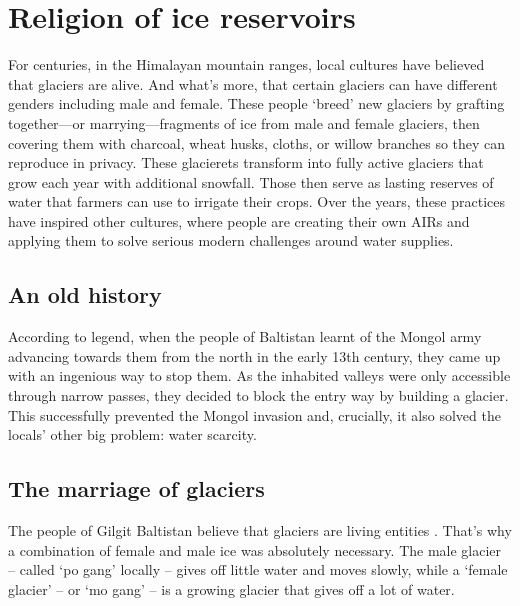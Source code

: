 \chapter{Religion of ice reservoirs}


For centuries, in the Himalayan mountain ranges, local cultures have believed that glaciers are alive. And
what’s more, that certain glaciers can have different genders including male and female. These people ‘breed’
new glaciers by grafting together—or marrying—fragments of ice from male and female glaciers, then covering them
with charcoal, wheat husks, cloths, or willow branches so they can reproduce in privacy. These glacierets
transform into fully active glaciers that grow each year with additional snowfall. Those then serve as lasting
reserves of water that farmers can use to irrigate their crops. Over the years, these practices have inspired
other cultures, where people are creating their own \ac{AIRs} and applying them to solve
serious modern challenges around water supplies.

\section{An old history}

According to legend, when the people of Baltistan learnt of the Mongol army advancing towards
them from the north in the early 13th century, they came up with an ingenious way to stop them. As the inhabited
valleys were only accessible through narrow passes, they decided to block the entry way by building a glacier.
This successfully prevented the Mongol invasion and, crucially, it also solved the locals’ other big problem:
water scarcity.

\section{The marriage of glaciers}

The people of Gilgit Baltistan believe that glaciers are living entities
\citep{shabinafarazGlacierMarriagesPakistan2020, khanMarriageGlaciersPrzekroj2020}. That’s why a combination of
female and male ice was absolutely necessary. The male glacier – called ‘po gang’ locally – gives off little
water and moves slowly, while a ‘female glacier’ – or ‘mo gang’ – is a growing glacier that gives off a lot of
water.

